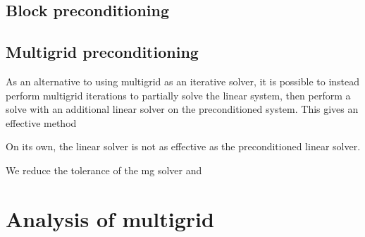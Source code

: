 \subsection{Block preconditioning}



\subsection{Multigrid preconditioning}

As an alternative to using multigrid as an iterative solver, it is possible to instead perform multigrid iterations to partially solve the linear system, then perform a solve with an additional linear solver on the preconditioned system.
This gives an effective method  

On its own, the linear solver is not as effective as the preconditioned linear solver.



We reduce the tolerance of the mg solver and 






\section{Analysis of multigrid}

